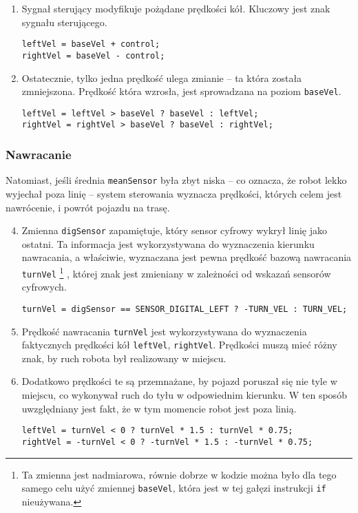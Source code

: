 \documentclass[11pt]{article}
\begin{document}
\begin{enumerate}
\item Sygnał sterujący modyfikuje pożądane prędkości kół. Kluczowy jest znak sygnału sterującego.
\begin{lstlisting}[firstnumber = 112]
leftVel = baseVel + control;
rightVel = baseVel - control;
\end{lstlisting}

\item Ostatecznie, tylko jedna prędkość ulega zmianie -- ta która została zmniejszona. Prędkość która wzrosła, jest sprowadzana na poziom \texttt{baseVel}.
\begin{lstlisting}[firstnumber = 117]
leftVel = leftVel > baseVel ? baseVel : leftVel;
rightVel = rightVel > baseVel ? baseVel : rightVel;
\end{lstlisting}
\end{enumerate}

\subsubsection*{Nawracanie}
Natomiast, jeśli średnia \texttt{meanSensor} była zbyt niska -- co oznacza, że robot lekko wyjechał poza linię -- system sterowania wyznacza prędkości, których celem jest nawrócenie, i powrót pojazdu na trasę.
\begin{enumerate}
\setcounter{enumi}{3}
\item Zmienna \texttt{digSensor} zapamiętuje, który sensor cyfrowy wykrył linię jako ostatni. Ta informacja jest wykorzystywana do wyznaczenia kierunku nawracania, a właściwie, wyznaczana jest pewna prędkość bazową nawracania \texttt{turnVel}%
\footnote{Ta zmienna jest nadmiarowa, równie dobrze w kodzie można było dla tego samego celu użyć zmiennej \texttt{baseVel}, która jest w tej gałęzi instrukcji \texttt{if} nieużywana.}%
, której znak jest zmieniany w zależności od wskazań sensorów cyfrowych.
\begin{lstlisting}[firstnumber = 122]
turnVel = digSensor == SENSOR_DIGITAL_LEFT ? -TURN_VEL : TURN_VEL;
\end{lstlisting}

\item Prędkość nawracania \texttt{turnVel} jest wykorzystywana do wyznaczenia faktycznych prędkości kół \texttt{leftVel}, \texttt{rightVel}. Prędkości muszą mieć różny znak, by ruch robota był realizowany w miejscu.

\item Dodatkowo prędkości te są przemnażane, by pojazd poruszał się nie tyle w miejscu, co wykonywał ruch do tyłu w odpowiednim kierunku. W ten sposób uwzględniany jest fakt, że w tym momencie robot jest poza linią.
\begin{lstlisting}[firstnumber = 127]
leftVel = turnVel < 0 ? turnVel * 1.5 : turnVel * 0.75;
rightVel = -turnVel < 0 ? -turnVel * 1.5 : -turnVel * 0.75;
\end{lstlisting}
\end{enumerate}
\end{document}
